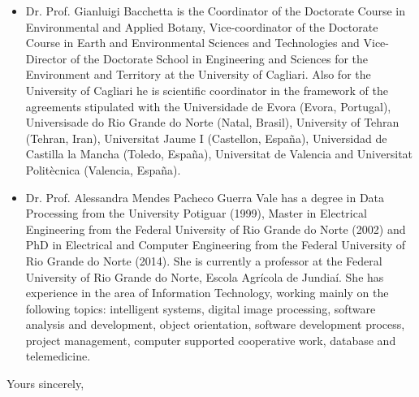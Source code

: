 \documentclass{letter}
\begin{document}
\begin{letter}{}
\begin{itemize}
		\item Dr. Prof. Gianluigi Bacchetta is the Coordinator of the Doctorate Course in Environmental and Applied Botany, Vice-coordinator of the Doctorate Course in Earth and Environmental Sciences and Technologies and Vice-Director of the Doctorate School in Engineering and Sciences for the Environment and Territory at the University of Cagliari. Also for the University of Cagliari he is scientific coordinator in the framework of the agreements stipulated with the Universidade de Evora (Evora, Portugal), Universisade do Rio Grande do Norte (Natal, Brasil), University of Tehran (Tehran, Iran), Universitat Jaume I (Castellon, España), Universidad de Castilla la Mancha (Toledo, España), Universitat de Valencia and Universitat Politècnica (Valencia, España).
		\item Dr. Prof.  Alessandra Mendes Pacheco Guerra Vale has a degree in Data Processing from the University Potiguar (1999), Master in Electrical Engineering from the Federal University of Rio Grande do Norte (2002) and PhD in Electrical and Computer Engineering from the Federal University of Rio Grande do Norte (2014). She is currently a professor at the Federal University of Rio Grande do Norte, Escola Agrícola de Jundiaí. She has experience in the area of Information Technology, working mainly on the following topics: intelligent systems, digital image processing, software analysis and development, object orientation, software development process, project management, computer supported cooperative work, database and telemedicine.
		\end{itemize}
		
		\closing{Yours sincerely,}
	\end{letter}
	
\end{document}
